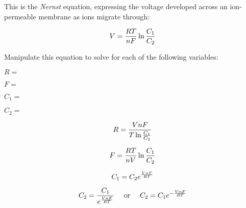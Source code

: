 

This is the {\it Nernst} equation, expressing the voltage developed across an ion-permeable membrane as ions migrate through:

$$V = {RT \over nF} \ln {C_1 \over C_2}$$

Manipulate this equation to solve for each of the following variables:

\vskip 10pt

$R =$

\vskip 10pt

$F =$

\vskip 10pt

$C_1 =$

\vskip 10pt

$C_2 =$

\vskip 10pt







$$R = {VnF \over {T \ln {C_1 \over C_2}}}$$

\vskip 20pt

$$F = {RT \over nV} \ln {C_1 \over C_2}$$

\vskip 20pt

$$C_1 = C_2 e^{VnF \over RT}$$

\vskip 20pt

$$C_2 = {C_1 \over {e^{VnF \over RT}}} \hskip 10pt \hbox{ or } \hskip 10pt C_2 = C_1 e^{-{VnF \over RT}}$$











